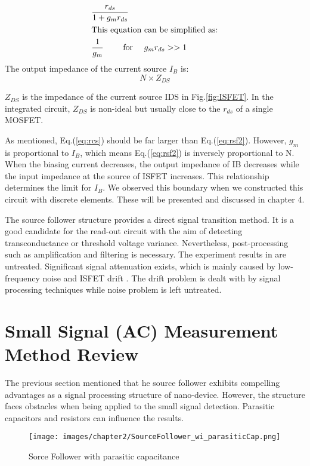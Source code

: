 \begin{align}
    & \frac{r_{ds}}{1 + g_mr_{ds}}\\
\intertext{This equation can be simplified as:}
    & \frac{1}{g_m} \qquad \text{ for } \quad g_mr_{ds} >> 1 \label{eq:rsf2}
\end{align}
The output impedance of the current source $I_B$ is:
\begin{equation} \label{eq:rcs}
    N\times Z_{DS}
\end{equation}

$Z_{DS}$ is the impedance of the current source I{\scriptsize DS} in Fig.\ref{fig:ISFET}.
In the integrated circuit, $Z_{DS}$ is non-ideal but usually close to the $r_{ds}$ of a single MOSFET.

As mentioned, Eq.(\ref{eq:rcs}) should be far larger than Eq.(\ref{eq:rsf2}).
However, $g_m$ is proportional to $I_B$, which means Eq.(\ref{eq:rsf2}) is inversely proportional to N.
When the biasing current decreases, the output impedance of I{\scriptsize B} decreases while the input impedance at the source of ISFET increases.
This relationship determines the limit for $I_B$.
We observed this boundary when we constructed this circuit with discrete elements.
These will be presented and discussed in chapter 4.

The source follower structure provides a direct signal transition method.
It is a good candidate for the read-out circuit with the aim of detecting transconductance or threshold voltage variance.
Nevertheless, post-processing such as amplification and filtering is necessary.
The experiment results in \cite{SF1} are untreated.
Significant signal attenuation exists, which is mainly caused by low-frequency noise and ISFET drift \cite{Drift}.
The drift problem is dealt with by signal processing techniques while noise problem is left untreated.


\section{Small Signal (AC) Measurement Method Review}  \label{sec:AC}
The previous section mentioned that he source follower exhibits compelling advantages as a signal processing structure of nano-device.
However, the structure faces obstacles when being applied to the small signal detection.
Parasitic capacitors and resistors can influence the results.

\begin{figure}[ht]
    \centering
    \texttt{[image: images/chapter2/SourceFollower\_wi\_parasiticCap.png]}
    \fontsize{6}{7}\selectfont
    \caption{Sorce Follower with parasitic capacitance}
    \label{fig:SF_pC}
\end{figure}

